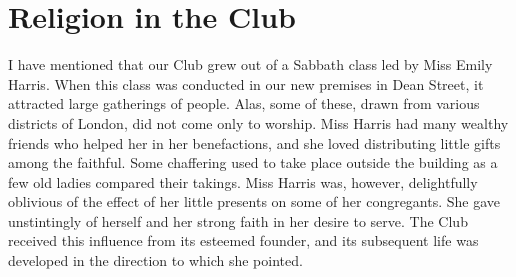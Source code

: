\chapter{Religion in the Club}

I have mentioned that our Club grew out of a Sabbath
class led by Miss Emily Harris. When this class was
conducted in our new premises in Dean Street, it attracted
large gatherings of people. Alas, some of these, drawn
from various districts of London, did not come only to
worship. Miss Harris had many wealthy friends who
helped her in her benefactions, and she loved distributing
little gifts among the faithful. Some chaffering used to
take place outside the building as a few old ladies compared
their takings. Miss Harris was, however, delightfully
oblivious of the effect of her little presents on some
of her congregants. She gave unstintingly of herself and
her strong faith in her desire to serve. The Club received
this influence from its esteemed founder, and its subsequent
life was developed in the direction to which she
pointed.

